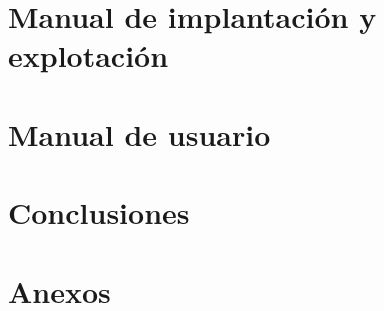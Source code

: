 \documentclass[a4paper,11pt]{book}
\begin{document}
\chapter{Manual de implantación y explotación}


\chapter{Manual de usuario}


\chapter{Conclusiones}


\chapter{Anexos}


\chapter*{\bibname}






\end{document}
